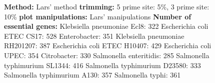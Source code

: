 \documentclass[a4paper,10pt]{article}
\begin{document}
\begin{figure}
{\textbf{Method:} Lars' method \newline
\textbf{trimming:} 5 prime site: 5\%, 3 prime site: 10\%\newline
\textbf{plot manipulations:} Lars' manipulations\newline
\textbf{Number of essential genes:}\newline
Klebsiella pneumoniae Ecl8: 322 \newline
Escherichia coli ETEC CS17: 528 \newline
Enterobacter: 351 \newline
Klebsiella pneumoniae RH201207: 387 \newline
Escherichia coli ETEC H10407: 429 \newline
Escherichia coli UPEC: 354 \newline
Citrobacter: 330 \newline
Salmonella enteritidis: 285 \newline
Salmonella typhimurium SL1344: 416 \newline
Salmonella typhimurium D23580: 333 \newline
Salmonella typhimurium A130: 357 \newline
Salmonella typhi: 361}
\end{figure}
\end{document}
